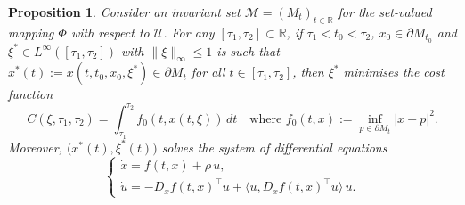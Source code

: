 \documentclass[reqno]{amsart}
\newtheorem{prop}[thm]{Proposition}
\theoremstyle{definition}
\numberwithin{equation}{section}
\newcommand{\R}{\mathbb{R}}
\newcommand{\M}{\mathscr{M}}
\newcommand{\U}{\mathcal{U}}
\begin{document}
\begin{prop}\label{prop:boundary-trajectories-PMP}
     Consider an invariant set $\M=(M_t)_{t\in\R}$ for the set-valued mapping $\Phi$ with respect to $\U$. For any $[\tau_1,\tau_2]\subset\R$, if $\tau_1<t_0<\tau_2$, $x_0\in\partial M_{t_0}$ and $\xi^*\in L^\infty([\tau_1,\tau_2])$ with $\|\xi\|_\infty\le 1$ is such that $x^*(t):=x(t,t_0,x_0,\xi^*)\in\partial M_t$ for all $t\in[\tau_1,\tau_2]$, then $\xi^*$  minimises the cost function 
     \begin{equation}\label{eq:cost-function}
C(\xi,\tau_1,\tau_2)=\int_{\tau_1}^{\tau_2} f_0(t,x(t,\xi))\,dt\quad\text{where } f_0(t,x):=\inf_{p\in\partial M_t}|x-p|^2.
\end{equation}
Moreover, $\big(x^*(t),\xi^*(t)\big)$ solves the system of differential equations
\begin{equation}\label{eq:boundary-system}
     \begin{cases}
    \dot x=f(t,x)+\rho\,u,\\
    \dot u=-D_xf(t,x)^\top u+\langle u,D_xf(t,x)^\top u\rangle\, u.
\end{cases}
     \end{equation}
\end{prop}
\end{document}
